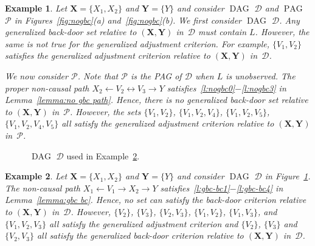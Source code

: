 \documentclass[11pt,a4paper]{article}
\newtheorem{example}{Example}
\DeclareMathOperator{\DAG}{DAG}
\DeclareMathOperator{\PAG}{PAG}
\newcommand{\g}[1][G]{\mathcal{#1}}
\begin{document}
\begin{example}

 Let $\mathbf{X} = \{X_1,X_2\}$ and $\mathbf{Y} = \{Y\}$ and consider $\DAG$ $\g[D]$ and $\PAG$ $\g[P]$ in Figures~\ref{fig:nogbc}(a) and~\ref{fig:nogbc}(b).
   We first consider $\DAG$ $\g[D]$. Any generalized back-door set relative to $(\mathbf{X},\mathbf{Y})$ in~$\g[D]$ must contain $L$. However, the same is not true for the generalized adjustment criterion. For example, $\{ V_1,V_2\}$ satisfies the generalized adjustment criterion relative to $(\mathbf{X},\mathbf{Y})$ in~$\g[D]$.

We now consider $\g[P]$. Note that $\g[P]$ is the PAG of $\g[D]$ when $L$ is unobserved. 
The proper non-causal path $X_2 \leftarrow V_2 \leftrightarrow V_3 \rightarrow Y$ satisfies~\ref{l:nogbc0}$-$\ref{l:nogbc3} in Lemma~\ref{lemma:no gbc path}. Hence, there is no generalized back-door set relative to $(\mathbf{X},\mathbf{Y})$ in~$\g[P]$.  However, the sets $\{ V_1,V_2\}$, $\{V_1,V_2,V_4\}$, $\{V_1,V_2,V_5\}$, $\{V_1,V_2,V_4,V_5\}$ all satisfy the generalized adjustment criterion relative to $(\mathbf{X},\mathbf{Y})$ in~$\g[P]$.
   \label{ex:nogbc}
\end{example}

\begin{figure}
     \centering
   \caption{ $\DAG$ $\g[D]$ used in Example~\ref{ex:constr-gbc-nodsep}.}
   \label{fig:constr-gbc-nodsep}
\end{figure}
\begin{example}
  Let $\mathbf{X} = \{X_1,X_2\}$ and $\mathbf{Y} = \{ Y \}$ and consider $\DAG$ $\g[D]$ in Figure~\ref{fig:constr-gbc-nodsep}.
The non-causal path $X_1 \leftarrow V_1 \rightarrow X_2 \rightarrow Y$ satisfies~\ref{l:gbc-bc1}$-$\ref{l:gbc-bc4} in Lemma~\ref{lemma:gbc bc}. Hence, no set can satisfy the back-door criterion relative to $(\mathbf{X},\mathbf{Y})$ in~$\g[D]$. However, $\{V_2\}$, $\{V_3\}$, $\{V_2,V_3\}$, $\{V_1,V_2\}$, $\{V_1,V_3\}$, and $\{V_1, V_2, V_3\}$ all satisfy the generalized adjustment criterion and $\{V_2\}$, $\{V_3\}$ and $\{V_2,V_3\}$ all satisfy the generalized back-door criterion relative to $(\mathbf{X},\mathbf{Y})$ in~$\g[D]$.
\label{ex:constr-gbc-nodsep}
\end{example}
\end{document}
